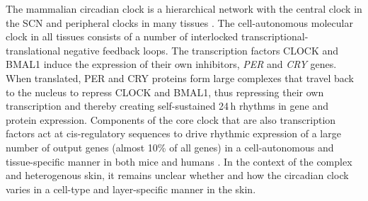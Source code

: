 The mammalian circadian clock is a hierarchical network with the central clock in the SCN and peripheral clocks in many tissues \cite{}. The cell-autonomous molecular clock in all tissues \cite{Takahashi2017, Dibner2010} consists of a number of interlocked transcriptional-translational negative feedback loops. The transcription factors CLOCK and BMAL1 induce the expression of their own inhibitors, \textit{PER} and \textit{CRY} genes. When translated, PER and CRY proteins form large complexes that travel back to the nucleus to repress CLOCK and BMAL1, thus repressing their own transcription and thereby creating self-sustained 24\,h rhythms in gene and protein expression. Components of the core clock that are also transcription factors act at cis-regulatory sequences to drive  rhythmic expression of a large number of output genes (almost 10\% of all genes) in a cell-autonomous and tissue-specific manner in both mice \cite{Zhang2014} and humans \cite{Ruben2018}. In the context of the complex and heterogenous skin, it remains unclear whether and how the circadian clock varies in a cell-type and layer-specific manner in the skin.


